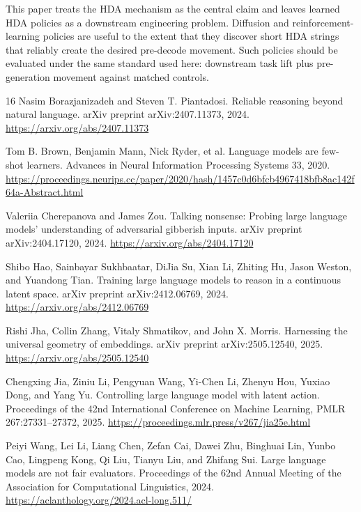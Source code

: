 \documentclass[11pt]{article}
\newcommand{\hda}{\textsc{HDA}}
\begin{document}
This paper treats the \hda{} mechanism as the central claim and leaves learned \hda{} policies as a downstream engineering problem. Diffusion and reinforcement-learning policies are useful to the extent that they discover short \hda{} strings that reliably create the desired pre-decode movement. Such policies should be evaluated under the same standard used here: downstream task lift plus pre-generation movement against matched controls.

\begin{thebibliography}{16}
Nasim Borazjanizadeh and Steven T. Piantadosi.
\newblock Reliable reasoning beyond natural language.
\newblock arXiv preprint arXiv:2407.11373, 2024.
\newblock \url{https://arxiv.org/abs/2407.11373}

Tom B. Brown, Benjamin Mann, Nick Ryder, et al.
\newblock Language models are few-shot learners.
\newblock Advances in Neural Information Processing Systems 33, 2020.
\newblock \url{https://proceedings.neurips.cc/paper/2020/hash/1457c0d6bfcb4967418bfb8ac142f64a-Abstract.html}

Valeriia Cherepanova and James Zou.
\newblock Talking nonsense: Probing large language models' understanding of adversarial gibberish inputs.
\newblock arXiv preprint arXiv:2404.17120, 2024.
\newblock \url{https://arxiv.org/abs/2404.17120}

Shibo Hao, Sainbayar Sukhbaatar, DiJia Su, Xian Li, Zhiting Hu, Jason Weston, and Yuandong Tian.
\newblock Training large language models to reason in a continuous latent space.
\newblock arXiv preprint arXiv:2412.06769, 2024.
\newblock \url{https://arxiv.org/abs/2412.06769}

Rishi Jha, Collin Zhang, Vitaly Shmatikov, and John X. Morris.
\newblock Harnessing the universal geometry of embeddings.
\newblock arXiv preprint arXiv:2505.12540, 2025.
\newblock \url{https://arxiv.org/abs/2505.12540}

Chengxing Jia, Ziniu Li, Pengyuan Wang, Yi-Chen Li, Zhenyu Hou, Yuxiao Dong, and Yang Yu.
\newblock Controlling large language model with latent action.
\newblock Proceedings of the 42nd International Conference on Machine Learning, PMLR 267:27331--27372, 2025.
\newblock \url{https://proceedings.mlr.press/v267/jia25e.html}

Peiyi Wang, Lei Li, Liang Chen, Zefan Cai, Dawei Zhu, Binghuai Lin, Yunbo Cao, Lingpeng Kong, Qi Liu, Tianyu Liu, and Zhifang Sui.
\newblock Large language models are not fair evaluators.
\newblock Proceedings of the 62nd Annual Meeting of the Association for Computational Linguistics, 2024.
\newblock \url{https://aclanthology.org/2024.acl-long.511/}


\end{thebibliography}
\end{document}
